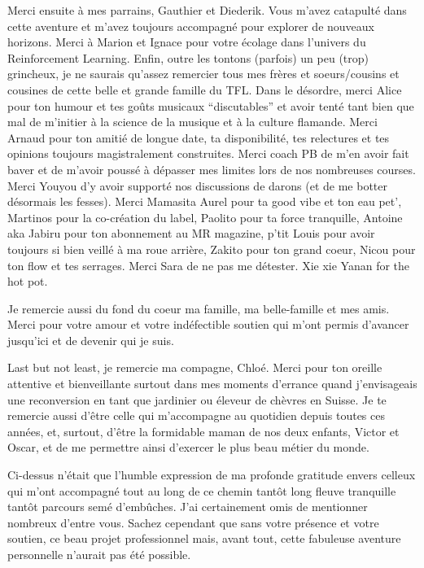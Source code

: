 Merci ensuite à mes parrains, Gauthier et Diederik. Vous m'avez catapulté dans cette aventure et m'avez toujours accompagné pour explorer de nouveaux horizons. Merci à Marion et Ignace pour votre écolage dans l'univers du Reinforcement Learning. Enfin, outre les tontons (parfois) un peu (trop) grincheux, je ne saurais qu'assez remercier tous mes frères et soeurs/cousins et cousines de cette belle et grande famille du TFL. Dans le désordre, merci Alice pour ton humour et tes goûts musicaux ``discutables'' et avoir tenté tant bien que mal de m'initier à la science de la musique et à la culture flamande. Merci Arnaud pour ton amitié de longue date, ta disponibilité, tes relectures et tes opinions toujours magistralement construites. Merci coach PB de m'en avoir fait baver et de m'avoir poussé à dépasser mes limites lors de nos nombreuses courses. Merci Youyou d'y avoir supporté nos discussions de darons (et de me botter désormais les fesses). Merci Mamasita Aurel pour ta good vibe et ton eau pet', Martinos pour la co-création du label, Paolito pour ta force tranquille, Antoine aka Jabiru pour ton abonnement au MR magazine, p'tit Louis pour avoir toujours si bien veillé à ma roue arrière, Zakito pour ton grand coeur, Nicou pour ton flow et tes serrages. Merci Sara de ne pas me détester. Xie xie Yanan for the hot pot.

Je remercie aussi du fond du coeur ma famille, ma belle-famille et mes amis. Merci pour votre amour et votre indéfectible soutien qui m'ont permis d'avancer jusqu'ici et de devenir qui je suis.

Last but not least, je remercie ma compagne, Chloé. Merci pour ton oreille attentive et bienveillante surtout dans mes moments d'errance quand j'envisageais une reconversion en tant que jardinier ou éleveur de chèvres en Suisse. Je te remercie aussi d'être celle qui m'accompagne au quotidien depuis toutes ces années, et, surtout, d'être la formidable maman de nos deux enfants, Victor et Oscar, et de me permettre ainsi d'exercer le plus beau métier du monde.

Ci-dessus n'était que l'humble expression de ma profonde gratitude envers celleux qui m'ont accompagné tout au long de ce chemin tantôt long fleuve tranquille tantôt parcours semé d'embûches. J'ai certainement omis de mentionner nombreux d'entre vous. Sachez cependant que sans votre présence et votre soutien, ce beau projet professionnel mais, avant tout, cette fabuleuse aventure personnelle n'aurait pas été possible.




